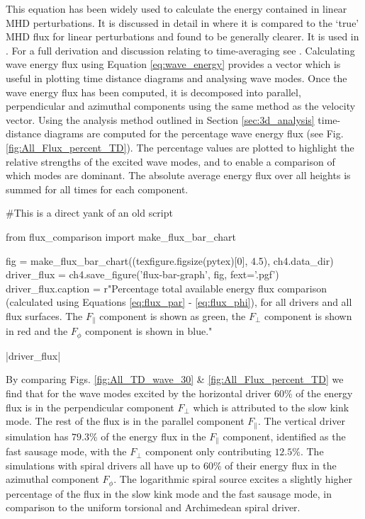 This equation has been widely used to calculate the energy contained in linear MHD perturbations.
It is discussed in detail in \cite{bogdan2003} where it is compared to the `true' MHD flux for linear perturbations and found to be generally clearer. 
It is used in \cite{vigeesh2009, vigeesh2012, khomenko2012}. 
For a full derivation and discussion relating to time-averaging see \cite{leroy1985}.
Calculating wave energy flux using Equation \ref{eq:wave_energy} provides a vector which is useful in plotting time distance diagrams and analysing wave modes.
Once the wave energy flux has been computed, it is decomposed into parallel, perpendicular and azimuthal components using the same method as the velocity vector. 
Using the analysis method outlined in Section \ref{sec:3d_analysis} time-distance diagrams are computed for the percentage wave energy flux (see Fig. \ref{fig:All_Flux_percent_TD}). 
The percentage values are plotted to highlight the relative strengths of the excited wave modes, and to enable a comparison of which modes are dominant. 
The absolute average energy flux over all heights is summed for all times for each component.


\begin{pycode}[chapter4]
#This is a direct yank of an old script

from flux_comparison import make_flux_bar_chart

fig = make_flux_bar_chart((texfigure.figsize(pytex)[0], 4.5), ch4.data_dir)
driver_flux = ch4.save_figure('flux-bar-graph', fig, fext='.pgf')
driver_flux.caption = r"Percentage total available energy flux comparison (calculated using Equations \ref{eq:flux_par} - \ref{eq:flux_phi}), for all drivers and all flux surfaces. The $F_\parallel$ component is shown as green, the $F_\perp$ component is shown in red and the $F_\phi$ component is shown in blue."
\end{pycode}

\py[chapter4]|driver_flux|


By comparing Figs. \ref{fig:All_TD_wave_30} \& \ref{fig:All_Flux_percent_TD} we find that for the wave modes excited by the horizontal driver $60$\% of the energy flux is in the perpendicular component $F_\perp$ which is attributed to the slow kink mode.
The rest of the flux is in the parallel component $F_\parallel$. 
The vertical driver simulation has $79.3$\% of the energy flux in the $F_\parallel$ component, identified as the fast sausage mode, with the $F_\perp$ component only contributing $12.5$\%. 
The simulations with spiral drivers all have up to $60$\% of their energy flux in the azimuthal component $F_\phi$. 
The logarithmic spiral source excites a slightly higher percentage of the flux in the slow kink mode and the fast sausage mode, in comparison to the uniform torsional and Archimedean spiral driver.

